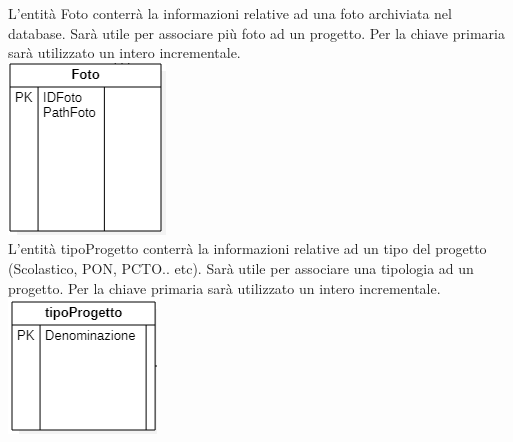 \documentclass{article}
\begin{document}
   L'entità Foto conterrà la informazioni relative ad una foto archiviata nel database. Sarà utile per associare più foto ad un progetto. Per la chiave primaria sarà utilizzato un intero incrementale.\\
	\includegraphics[scale=0.5]{foto.png}\\
   L'entità tipoProgetto conterrà la informazioni relative ad un tipo del progetto (Scolastico, PON, PCTO.. etc). Sarà utile per associare una tipologia ad un progetto. Per la chiave primaria sarà utilizzato un intero incrementale.\\
	\includegraphics[scale=0.5]{tipoprogetto.png}
\end{document}
